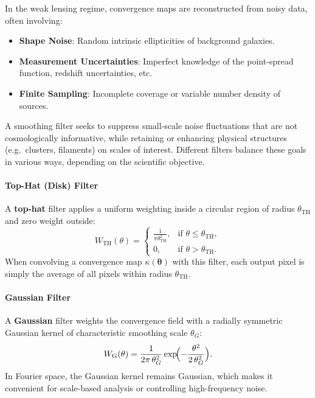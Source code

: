 In the weak lensing regime, convergence maps are reconstructed from noisy data, often involving:
\begin{itemize}
    \item \textbf{Shape Noise}: Random intrinsic ellipticities of background galaxies.
    \item \textbf{Measurement Uncertainties}: Imperfect knowledge of the point-spread function, redshift uncertainties, etc.
    \item \textbf{Finite Sampling}: Incomplete coverage or variable number density of sources.
\end{itemize}
A smoothing filter seeks to suppress small-scale noise fluctuations that are not cosmologically informative, while retaining or enhancing physical structures (e.g.\ clusters, filaments) on scales of interest. Different filters balance these goals in various ways, depending on the scientific objective.

\paragraph{Top-Hat (Disk) Filter}
A \textbf{top-hat} filter applies a uniform weighting inside a circular region of radius $\theta_{\mathrm{TH}}$ and zero weight outside:
\begin{equation}
    W_{\mathrm{TH}}(\theta) = 
    \begin{cases}
        \frac{1}{\pi \theta_{\mathrm{TH}}^2}, & \text{if } \theta \le \theta_{\mathrm{TH}},\\[6pt]
        0, & \text{if } \theta > \theta_{\mathrm{TH}}.
    \end{cases}
\end{equation}
When convolving a convergence map $\kappa(\boldsymbol{\theta})$ with this filter, each output pixel is simply the average of all pixels within radius $\theta_{\mathrm{TH}}$.

\paragraph{Gaussian Filter}
A \textbf{Gaussian} filter weights the convergence field with a radially symmetric Gaussian kernel of characteristic smoothing scale $\theta_G$:
\begin{equation}
    W_{\mathrm{G}}(\theta) = \frac{1}{2 \pi \,\theta_G^2}
    \exp\!\Bigl(-\frac{\theta^2}{2 \,\theta_G^2}\Bigr).
\end{equation}
In Fourier space, the Gaussian kernel remains Gaussian, which makes it convenient for scale-based analysis or controlling high-frequency noise.

